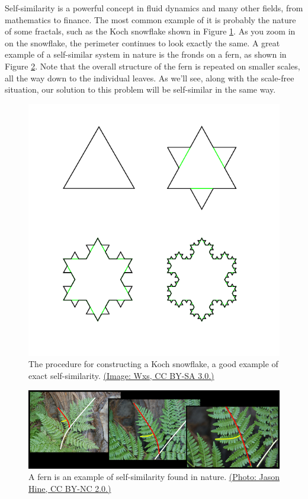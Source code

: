 Self-similarity is a powerful concept in fluid dynamics and many other fields, from mathematics to finance.  The most common example of it is probably the nature of some fractals, such as the Koch snowflake shown in Figure \ref{fig_koch}.  As you zoom in on the snowflake, the perimeter continues to look exactly the same.  A great example of a self-similar system in nature is the fronds on a fern, as shown in Figure \ref{fig_fern}.  Note that the overall structure of the fern is repeated on smaller scales, all the way down to the individual leaves.  As we'll see, along with the scale-free situation, our solution to this problem will be self-similar in the same way.

\begin{figure}
\centering
\includegraphics[width=0.5\linewidth]{Figures/Chapter2/fig_koch}
\caption{The procedure for constructing a Koch snowflake, a good example of exact self-similarity.  \href{https://commons.wikimedia.org/wiki/File:KochFlake.svg}{(Image: Wxs, CC BY-SA 3.0.)} }
\label{fig_koch}
\end{figure}

\begin{figure}
\centering
\includegraphics[width=1\linewidth]{Figures/Chapter2/fig_fern.png}
\caption{A fern is an example of self-similarity found in nature.  \href{https://www.flickr.com/photos/78523101@N04/7572281628}{(Photo: Jason Hine, CC BY-NC 2.0.)} }
\label{fig_fern}
\end{figure}

